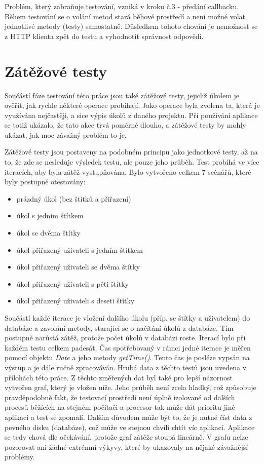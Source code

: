 Problém, který zabraňuje testování, vzniká v kroku č.3 - předání callbacku. Během testování se o volání metod stará běhové prostředí a není možné volat jednotlivé metody (testy) samostatně. Důsledkem tohoto chování je nemožnost  se z HTTP klienta zpět do testu a vyhodnotit správnost odpovědi.

\section{Zátěžové testy}

Součástí fáze testování této práce jsou také zátěžové testy, jejichž úkolem je ověřit, jak rychle některé operace probíhají. Jako operace byla zvolena ta, která je využívána nejčastěji, a sice výpis úkolů z daného projektu. Při používání aplikace se totiž ukázalo, že tato akce trvá poměrně dlouho, a zátěžové testy by mohly ukázat, jak moc závažný problém to je.

Zátěžové testy jsou postaveny na podobném principu jako jednotkové testy, až na to, že zde se nesleduje výsledek testu, ale pouze jeho průběh. Test probíhá ve více iteracích, aby byla zátěž vystupňována. Bylo vytvořeno celkem 7 scénářů, které byly postupně otestovány:

\begin{itemize}
\item prázdný úkol (bez štítků a přiřazení)
\item úkol s jedním štítkem
\item úkol se dvěma štítky
\item úkol přiřazený uživateli s jedním štítkem
\item úkol přiřazený uživateli se dvěma štítky
\item úkol přiřazený uživateli s pěti štítky
\item úkol přiřazený uživateli s deseti štítky
\end{itemize}

Součástí každé iterace je vložení dalšího úkolu (příp. se štítky a uživatelem) do databáze a zavolání metody, starající se o načítání úkolů z databáze. Tím postupně narůstá zátěž, protože počet úkolů v databázi roste. Iterací bylo při každém testu celkem padesát. Čas spotřebovaný v rámci jedné iterace je měřen pomocí objektu \emph{Date} a jeho metody \emph{getTime()}. Tento čas je posléze vypsán na výstup a je dále ručně zpracováván. Hrubá data z těchto testů jsou uvedena v přílohách této práce. Z těchto změřených dat byl také pro lepší názornost vytvořen graf, který je vložen níže. Jeho průběh není zcela hladký, což způsobuje pravděpodobně fakt, že testovací prostředí není úplně izolované od dalších procesů běžících na stejném počítači a procesor tak může dát prioritu jiné aplikaci a test se zpomalí. Dalším důvodem může být to, že je nutné číst data z pevného disku (databáze), což může ve stejnou chvíli chtít víc aplikací. Aplikace se tedy chová dle očekávání, protože graf zátěže stoupá lineárně. V grafu nelze pozorovat ani žádné extrémní výkyvy, které by ukazovaly na nějaké závažnější problémy.

